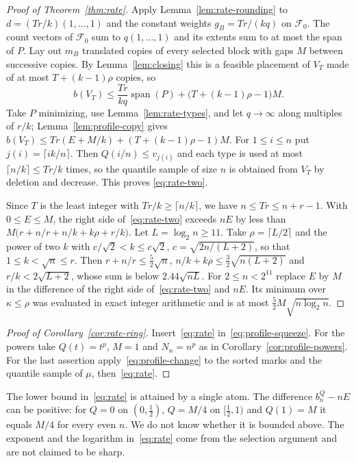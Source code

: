 \begin{proof}[Proof of Theorem~\ref{thm:rate}]
Apply Lemma~\ref{lem:rate-rounding} to $d=(Tr/k)(1,\ldots,1)$ and the
constant weights $g_B=Tr/(kq)$ on $\mathcal F_0$. The count vectors of
$\mathcal F_0$ sum to $q(1,\ldots,1)$ and its extents sum to at most the
span of $P$. Lay out $m_B$ translated copies of every selected block with
gaps $M$ between successive copies. By Lemma~\ref{lem:closing} this is a
feasible placement of $V_T$ made of at most $T+(k-1)\rho$ copies, so
\begin{equation}\label{eq:rate-finite}
 b(V_T)\le\frac{Tr}{kq}\operatorname{span}(P)+\bigl(T+(k-1)\rho-1\bigr)M .
\end{equation}
Take $P$ minimizing, use Lemma~\ref{lem:rate-types}, and let $q\to\infty$
along multiples of $r/k$; Lemma~\ref{lem:profile-copy} gives
$b(V_T)\le Tr(E+M/k)+(T+(k-1)\rho-1)M$. For $1\le i\le n$ put
$j(i)=\lceil ik/n\rceil$. Then $Q(i/n)\le v_{j(i)}$ and each type is used
at most $\lceil n/k\rceil\le Tr/k$ times, so the quantile sample of size
$n$ is obtained from $V_T$ by deletion and decrease. This proves
\eqref{eq:rate-two}.

Since $T$ is the least integer with $Tr/k\ge\lceil n/k\rceil$, we have
$n\le Tr\le n+r-1$. With $0\le E\le M$, the right side
of~\eqref{eq:rate-two} exceeds $nE$ by less than
$M\bigl(r+n/r+n/k+k\rho+r/k\bigr)$. Let $L=\log_2n\ge11$. Take
$\rho=\lceil L/2\rceil$ and the power of two $k$ with
$c/\sqrt2<k\le c\sqrt2$, $c=\sqrt{2n/(L+2)}$, so that
$1\le k<\sqrt n\le r$. Then $r+n/r\le\frac52\sqrt n$,
$n/k+k\rho\le\frac32\sqrt{n(L+2)}$ and $r/k<2\sqrt{L+2}$, whose sum is
below $2.44\sqrt{nL}$. For $2\le n<2^{11}$ replace $E$ by $M$ in the
difference of the right side of~\eqref{eq:rate-two} and $nE$. Its minimum
over $\kappa\le\rho$ was evaluated in exact integer arithmetic and is at
most $\frac52M\sqrt{n\log_2n}$.
\end{proof}

\begin{proof}[Proof of Corollary~\ref{cor:rate-ring}]
Insert~\eqref{eq:rate} in~\eqref{eq:profile-squeeze}. For the powers take
$Q(t)=t^p$, $M=1$ and $N_n=n^p$ as in Corollary~\ref{cor:profile-powers}.
For the last assertion apply~\eqref{eq:profile-change} to the sorted marks
and the quantile sample of $\mu$, then~\eqref{eq:rate}.
\end{proof}

\begin{remark}
The lower bound in~\eqref{eq:rate} is attained by a single atom. The
difference $b_n^Q-nE$ can be positive: for $Q=0$ on $(0,\frac12)$,
$Q=M/4$ on $[\frac12,1)$ and $Q(1)=M$ it equals $M/4$ for every even $n$.
We do not know whether it is bounded above. The exponent and the logarithm
in~\eqref{eq:rate} come from the selection argument and are not claimed to
be sharp.
\end{remark}
